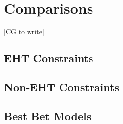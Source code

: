 \section{Comparisons}\label{sec:comparisons}

[CG to write]

\subsection{EHT Constraints}

\subsection{Non-EHT Constraints}

\subsection{Best Bet Models}

